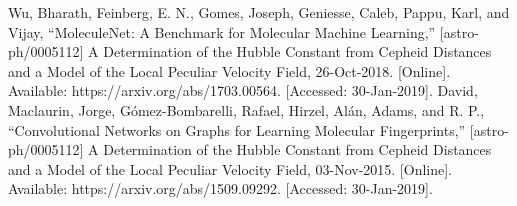 \documentclass[conference]{IEEEtran}
\begin{document}
\begin{thebibliography}{}
	 Wu, Bharath, Feinberg, E. N., Gomes, Joseph, Geniesse, Caleb, Pappu, Karl, and Vijay, “MoleculeNet: A Benchmark for Molecular Machine Learning,” [astro-ph/0005112] A Determination of the Hubble Constant from Cepheid Distances and a Model of the Local Peculiar Velocity Field, 26-Oct-2018. [Online]. Available: https://arxiv.org/abs/1703.00564. [Accessed: 30-Jan-2019].
	 David, Maclaurin, Jorge, Gómez-Bombarelli, Rafael, Hirzel, Alán, Adams, and R. P., “Convolutional Networks on Graphs for Learning Molecular Fingerprints,” [astro-ph/0005112] A Determination of the Hubble Constant from Cepheid Distances and a Model of the Local Peculiar Velocity Field, 03-Nov-2015. [Online]. Available: https://arxiv.org/abs/1509.09292. [Accessed: 30-Jan-2019].
\end{thebibliography}
\end{document}
